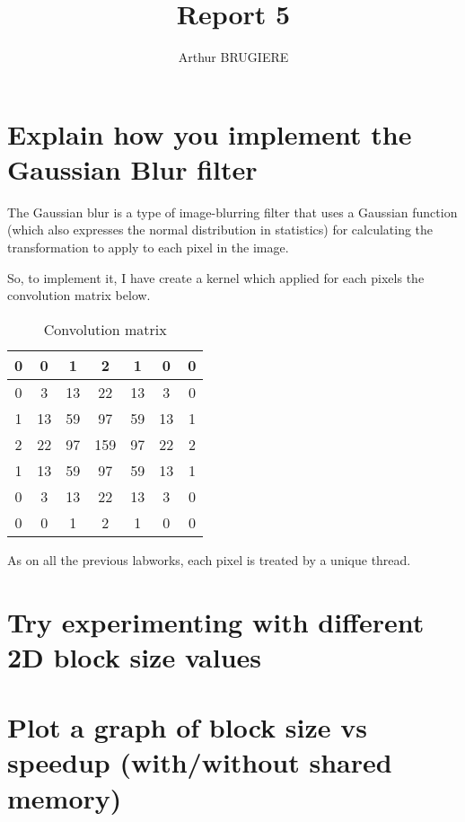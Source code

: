 \documentclass[11pt]{article} %
\title{Report 5}
\author{Arthur BRUGIERE}
\begin{document}
\maketitle

\section{Explain how you implement the Gaussian Blur filter}

The Gaussian blur is a type of image-blurring filter that uses a Gaussian function (which also expresses the normal distribution in statistics) for calculating the transformation to apply to each pixel in the image.

So, to implement it, I have create a kernel which applied for each pixels the convolution matrix below.

\begin{table}[h]
\begin{center}
  \begin{tabular}{ | c | c | c | c | c | c | c | }
    \hline
	0 & 0 & 1 & 2 & 1 & 0 & 0 \\ \hline
	0 & 3 & 13 & 22 & 13 & 3 & 0 \\ \hline
	1 & 13 & 59 & 97 & 59 & 13 & 1 \\ \hline
	2 & 22 & 97 & 159 & 97 & 22 & 2 \\ \hline
	1 & 13 & 59 & 97 & 59 & 13 & 1 \\ \hline
	0 & 3 & 13 & 22 & 13 & 3 & 0 \\ \hline
	0 & 0 & 1 & 2 & 1 & 0 & 0 \\
    \hline
  \end{tabular}
   \caption{Convolution matrix}
\end{center}
\end{table}

As on all the previous labworks, each pixel is treated by a unique thread.

\section{Try experimenting with different 2D block size values}

\section{Plot a graph of block size vs speedup (with/without shared memory)}
\end{document}
